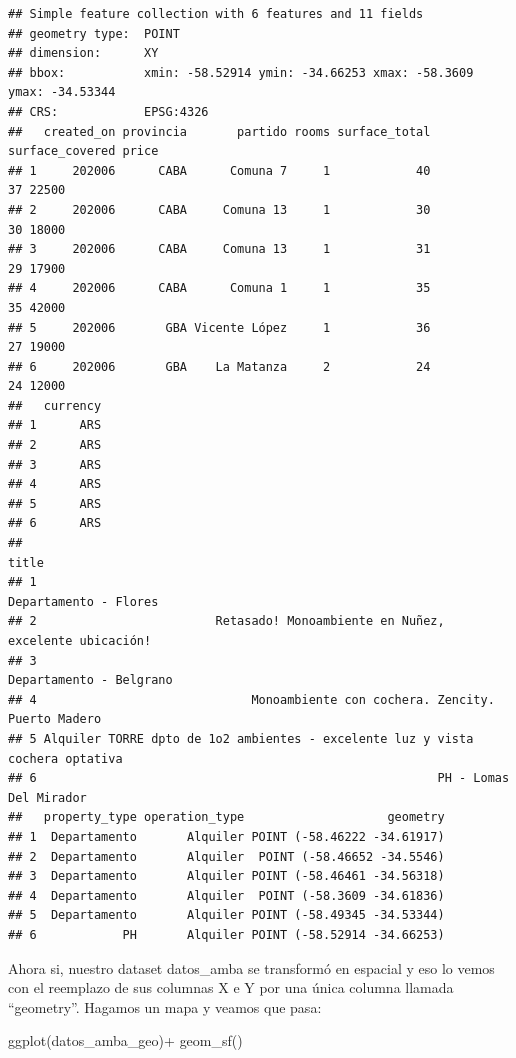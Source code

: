 \documentclass[
  spanish,
]{book}
\newenvironment{Shaded}{\begin{snugshade}}{\end{snugshade}}
\newcommand{\FunctionTok}[1]{\textcolor[rgb]{0.00,0.00,0.00}{#1}}
\newcommand{\NormalTok}[1]{#1}
\newcommand{\SpecialCharTok}[1]{\textcolor[rgb]{0.00,0.00,0.00}{#1}}
\begin{document}
\begin{verbatim}
## Simple feature collection with 6 features and 11 fields
## geometry type:  POINT
## dimension:      XY
## bbox:           xmin: -58.52914 ymin: -34.66253 xmax: -58.3609 ymax: -34.53344
## CRS:            EPSG:4326
##   created_on provincia       partido rooms surface_total surface_covered price
## 1     202006      CABA      Comuna 7     1            40              37 22500
## 2     202006      CABA     Comuna 13     1            30              30 18000
## 3     202006      CABA     Comuna 13     1            31              29 17900
## 4     202006      CABA      Comuna 1     1            35              35 42000
## 5     202006       GBA Vicente López     1            36              27 19000
## 6     202006       GBA    La Matanza     2            24              24 12000
##   currency
## 1      ARS
## 2      ARS
## 3      ARS
## 4      ARS
## 5      ARS
## 6      ARS
##                                                                           title
## 1                                                         Departamento - Flores
## 2                         Retasado! Monoambiente en Nuñez, excelente ubicación!
## 3                                                       Departamento - Belgrano
## 4                              Monoambiente con cochera. Zencity. Puerto Madero
## 5 Alquiler TORRE dpto de 1o2 ambientes - excelente luz y vista cochera optativa
## 6                                                        PH - Lomas Del Mirador
##   property_type operation_type                    geometry
## 1  Departamento       Alquiler POINT (-58.46222 -34.61917)
## 2  Departamento       Alquiler  POINT (-58.46652 -34.5546)
## 3  Departamento       Alquiler POINT (-58.46461 -34.56318)
## 4  Departamento       Alquiler  POINT (-58.3609 -34.61836)
## 5  Departamento       Alquiler POINT (-58.49345 -34.53344)
## 6            PH       Alquiler POINT (-58.52914 -34.66253)
\end{verbatim}

Ahora si, nuestro dataset datos\_amba se transformó en espacial y eso lo vemos con el reemplazo de sus columnas X e Y por una única columna llamada ``geometry''. Hagamos un mapa y veamos que pasa:

\begin{Shaded}
\begin{Highlighting}[]
\FunctionTok{ggplot}\NormalTok{(datos\_amba\_geo)}\SpecialCharTok{+}
  \FunctionTok{geom\_sf}\NormalTok{()}
\end{Highlighting}
\end{Shaded}
\end{document}
